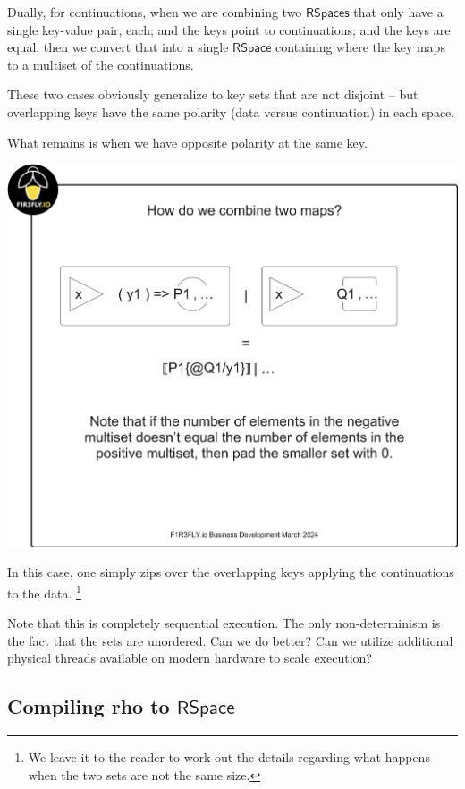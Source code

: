 Dually, for continuations, when we are combining two
$\mathsf{RSpaces}$ that only have a single key-value pair, each; and
the keys point to continuations; and the keys are equal, then we
convert that into a single $\mathsf{RSpace}$ containing where the key
maps to a multiset of the continuations.

These two cases obviously generalize to key sets that are not disjoint
-- but overlapping keys have the same polarity (data versus
continuation) in each space.

What remains is when we have opposite polarity at the same key.


\includegraphics[scale=0.25]{RHO20RSpaceSlide7.pdf}

In this case, one simply zips over the overlapping keys applying the
continuations to the data. \footnote{We leave it to the reader to work
  out the details regarding what happens when the two sets are not the
  same size.}

Note that this is completely sequential execution. The only
non-determinism is the fact that the sets are unordered. Can we do
better? Can we utilize additional physical threads available on modern
hardware to scale execution?

\subsection{Compiling rho to $\mathsf{RSpace}$}

